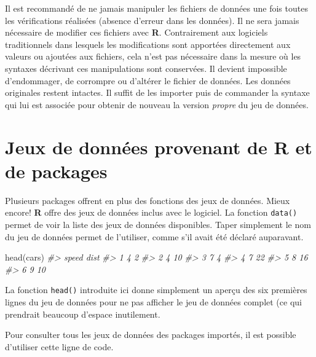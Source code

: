 \documentclass[
]{book}
\newenvironment{Shaded}{}{}
\newcommand{\CommentTok}[1]{\textit{#1}}
\newcommand{\FunctionTok}[1]{#1}
\newcommand{\NormalTok}[1]{#1}
\begin{document}
Il est recommandé de ne jamais manipuler les fichiers de données une fois toutes les vérifications réalisées (absence d'erreur dans les données). Il ne sera jamais nécessaire de modifier ces fichiers avec \textbf{R}. Contrairement aux logiciels traditionnels dans lesquels les modifications sont apportées directement aux valeurs ou ajoutées aux fichiers, cela n'est pas nécessaire dans la mesure où les syntaxes décrivant ces manipulations sont conservées. Il devient impossible d'endommager, de corrompre ou d'altérer le fichier de données. Les données originales restent intactes. Il suffit de les importer puis de commander la syntaxe qui lui est associée pour obtenir de nouveau la version \emph{propre} du jeu de données.

\hypertarget{jeux-de-donnuxe9es-provenant-de-r-et-de-packages}{%
\section{\texorpdfstring{Jeux de données provenant de \textbf{R} et de packages}{Jeux de données provenant de R et de packages}}\label{jeux-de-donnuxe9es-provenant-de-r-et-de-packages}}

Plusieurs packages offrent en plus des fonctions des jeux de données. Mieux encore! \textbf{R} offre des jeux de données inclus avec le logiciel. La fonction \texttt{data()} permet de voir la liste des jeux de données disponibles. Taper simplement le nom du jeu de données permet de l'utiliser, comme s'il avait été déclaré auparavant.

\begin{Shaded}
\begin{Highlighting}[]
\FunctionTok{head}\NormalTok{(cars)}
\CommentTok{\#\textgreater{}   speed dist}
\CommentTok{\#\textgreater{} 1     4    2}
\CommentTok{\#\textgreater{} 2     4   10}
\CommentTok{\#\textgreater{} 3     7    4}
\CommentTok{\#\textgreater{} 4     7   22}
\CommentTok{\#\textgreater{} 5     8   16}
\CommentTok{\#\textgreater{} 6     9   10}
\end{Highlighting}
\end{Shaded}

La fonction \texttt{head()} introduite ici donne simplement un aperçu des six premières lignes du jeu de données pour ne pas afficher le jeu de données complet (ce qui prendrait beaucoup d'espace inutilement.

Pour consulter tous les jeux de données des packages importés, il est possible d'utiliser cette ligne de code.
\end{document}
